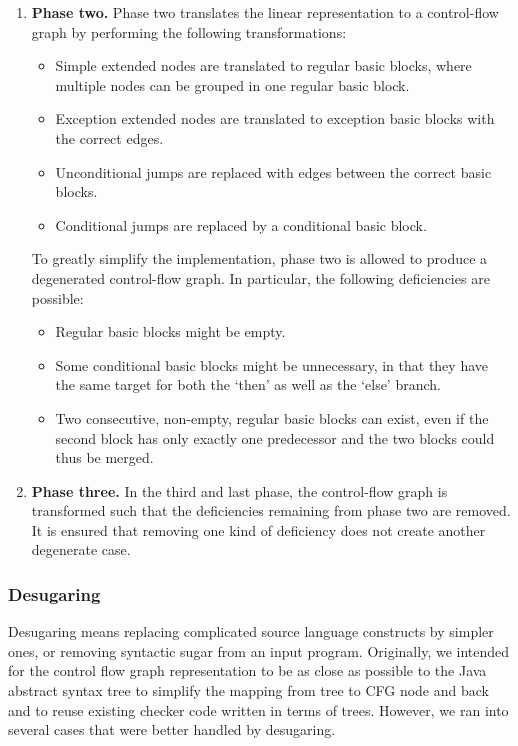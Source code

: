 \begin{enumerate}
    \item \textbf{Phase two.} Phase two translates the linear representation to a control-flow graph
    by performing the following transformations:
    \begin{itemize}
        \item Simple extended nodes are translated to regular basic blocks, where multiple nodes
        can be grouped in one regular basic block.
        \item Exception extended nodes are translated to exception basic blocks with the correct edges.
        \item Unconditional jumps are replaced with edges between the correct basic blocks.
        \item Conditional jumps are replaced by a conditional basic block.
    \end{itemize}
    To greatly simplify the implementation, phase two is allowed to produce a degenerated control-flow
    graph. In particular, the following deficiencies are possible:
    \begin{itemize}
    \item Regular basic blocks might be empty.
    \item Some conditional basic blocks might be unnecessary, in that they have the same target for both
    the `then' as well as the `else' branch.
    \item Two consecutive, non-empty, regular basic blocks can exist, even if the second block has only
    exactly one predecessor and the two blocks could thus be merged.
    \end{itemize}
    \item \textbf{Phase three.} In the third and last phase, the control-flow graph is transformed such that
    the deficiencies remaining from phase two are removed. It is ensured that removing one kind of deficiency
    does not create another degenerate case.
\end{enumerate}



\subsubsection{Desugaring}
\label{sec:desugaring}

Desugaring means replacing complicated source language constructs by simpler ones, or removing syntactic sugar from an input program.  Originally, we intended for the control flow graph representation to be as close as possible to the Java abstract syntax tree to simplify the mapping from tree to CFG node and back and to reuse existing checker code written in terms of trees.  However, we ran into several cases that were better handled by desugaring.

